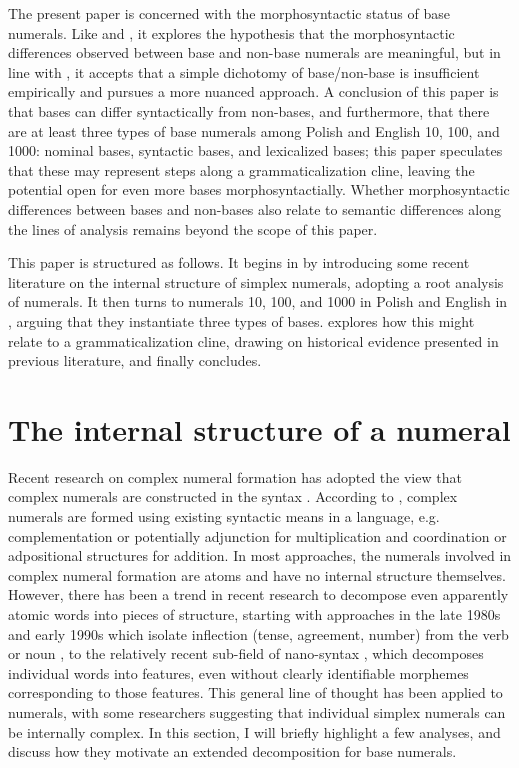 \documentclass[output=paper]{langscibook}
\begin{document}
The present paper is concerned with the morphosyntactic status of base numerals. Like \citet{kayne2005bases} and \citet{rothstein2013fregean}, it explores the hypothesis that the morphosyntactic differences observed between base and non-base numerals are meaningful, but in line with \citet{ionin_matushansky2018cardinals}, it accepts that a simple dichotomy of base/non-base is insufficient empirically and pursues a more nuanced approach. A conclusion of this paper is that bases can differ syntactically from non-bases, and furthermore, that there are at least three types of base numerals among Polish and English 10, 100, and 1000: nominal bases, syntactic bases, and lexicalized bases; this paper speculates that these may represent steps along a grammaticalization cline, leaving the potential open for even more bases morphosyntactially. Whether morphosyntactic differences between bases and non-bases also relate to semantic differences along the lines of  analysis remains beyond the scope of this paper.

This paper is structured as follows. It begins in  by introducing some recent literature on the internal structure of simplex numerals, adopting a root analysis of numerals. It then turns to numerals 10, 100, and 1000 in Polish and English in , arguing that they instantiate three types of bases.  explores how this might relate to a grammaticalization cline, drawing on historical evidence presented in previous literature, and finally  concludes.

\section{The internal structure of a numeral}\label{klo:numeralStructure}\largerpage

Recent research on complex numeral formation has adopted the view that complex numerals are constructed in the syntax \citep[see especially][]{im2004,IoninMatushansky2006, ionin_matushansky2018cardinals}. According to \citet{ionin_matushansky2018cardinals}, complex numerals are formed using existing syntactic means in a language, e.g. complementation or potentially adjunction for multiplication and coordination or adpositional structures for addition. In most approaches, the numerals involved in complex numeral formation are atoms and have no internal structure themselves. However, there has been a trend in recent research to decompose even apparently atomic words into pieces of structure, starting with approaches in the late 1980s and early 1990s which isolate inflection (tense, agreement, number) from the verb or noun \citep[e.g.][]{pollock1989infl, ritter1991nump}, to the relatively recent sub-field of nano-syntax \citep[e.g.][]{starke2010nanosyntax}, which decomposes individual words into features, even without clearly identifiable morphemes corresponding to those features. This general line of thought has been applied to numerals, with some researchers suggesting that individual simplex numerals can be internally complex. In this section, I will briefly highlight a few analyses, and discuss how they motivate an extended decomposition for base numerals.
\end{document}
